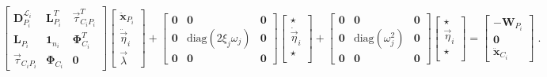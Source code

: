 \documentclass[smallcondensed]{svjour3}     %
\begin{document}
\begin{small}
\begin{equation}\label{eq:2nda}
\left[\begin{array}{ccc}\mathbf{D}^{\mathcal{L}_i}_{P_i} & \mathbf{L}_{P_i}^T & \vec{\tau}_{C_iP_i}^T \\ \mathbf{L}_{P_i} & \mathbf{1}_{n_i} & \mathbf{\Phi}_{C_i}^T \\
\vec{\tau}_{C_iP_i} & \mathbf{\Phi}_{C_i} & \mathbf{0}\end{array}\right]\left[\begin{array}{c}\ddot{\mathbf{x}}_{P_i}\\ \ddot{\vec{\eta}}_i\\\vec{\lambda}\end{array}\right]+\left[\begin{array}{ccc} \mathbf{0}& \mathbf{0}& \mathbf{0} \\  \mathbf{0} & \mbox{diag}(2\xi_j\omega_j)& \mathbf{0} \\\mathbf{0}& \mathbf{0}& \mathbf{0}\end{array}\right]\left[\begin{array}{c}\star \\ \dot{\vec{\eta}}_i \\ \star \\\end{array}\right]+\left[\begin{array}{ccc} \mathbf{0}& \mathbf{0}& \mathbf{0}\\  \mathbf{0}& \mbox{diag}(\omega_j^2)& \mathbf{0} \\\mathbf{0}& \mathbf{0}& \mathbf{0}\end{array}\right]\left[\begin{array}{c} \star \\ \vec{\eta}_i \\ \star\\ \end{array}\right]=\left[\begin{array}{c}-\mathbf{W}_{P_i} \\ \mathbf{0} \\ \ddot{\mathbf{x}}_{C_i}\end{array}\right]\;.
\end{equation}
\end{small}
\end{document}
